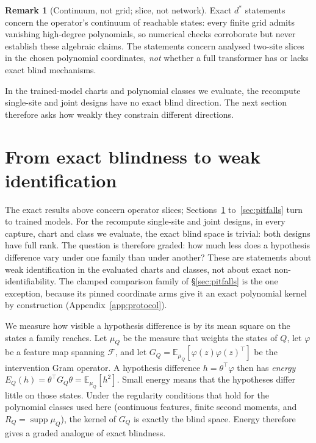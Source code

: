 \documentclass{article}
\theoremstyle{plain}
\theoremstyle{definition}
\newtheorem{remark}[theorem]{Remark}
\begin{document}
\begin{remark}[Continuum, not grid; slice, not network]
\label{rem:scope}
Exact $d^*$ statements concern the operator's continuum of reachable states: every finite grid admits vanishing
high-degree polynomials, so numerical checks corroborate but never establish these algebraic claims.
The statements concern analysed two-site slices in the chosen polynomial coordinates, \emph{not} whether a full
transformer has or lacks exact blind mechanisms.
\end{remark}

In the trained-model charts and polynomial classes we evaluate, the recompute single-site and joint designs have no
exact blind direction. The next section therefore asks how weakly they constrain different directions.

\section{From exact blindness to weak identification}
\label{sec:practical}

The exact results above concern operator slices; Sections~\ref{sec:practical} to~\ref{sec:pitfalls} turn to trained models. For the recompute single-site and joint
designs, in every capture, chart and class we evaluate, the exact blind space is trivial: both designs have full
rank. The question is therefore graded: how much less does a hypothesis difference vary under one family than under
another? These are statements about weak identification in the evaluated charts and classes, not about exact
non-identifiability. The clamped comparison family of \S\ref{sec:pitfalls} is the one exception, because its pinned
coordinate arms give it an exact polynomial kernel by construction (Appendix~\ref{app:protocol}).

We measure how visible a hypothesis difference is by its mean square on the states a family reaches. Let $\mu_Q$ be
the measure that weights the states of $Q$, let $\varphi$ be a feature map spanning $\mathcal F$, and let
$G_Q=\mathbb E_{\mu_Q}[\varphi(z)\varphi(z)^\top]$ be the intervention Gram operator. A hypothesis difference
$h=\theta^\top\varphi$ then has \emph{energy} $E_Q(h)=\theta^\top G_Q\theta=\mathbb E_{\mu_Q}[h^2]$. Small energy
means that the hypotheses differ little on those states. Under the regularity conditions that hold for the polynomial classes used here (continuous features, finite second
moments, and $R_Q=\operatorname{supp}\mu_Q$), the kernel of $G_Q$ is exactly the blind space. Energy therefore gives a
graded analogue of exact blindness.
\end{document}
